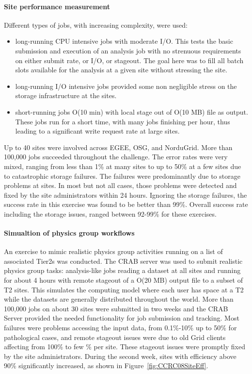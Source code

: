 \paragraph{Site performance measurement}
Different types of jobs, with increasing complexity, were used:
\begin{itemize}
\item long-running CPU intensive jobs with moderate I/O. This tests the basic submission and execution of an analysis job with no strenuous requirements on 
either submit rate, or I/O, or stageout. The goal here was to fill all batch slots available for the analysis at a given site without stressing the site.
\item long-running I/O intensive jobs provided some non negligible stress on 
the storage infrastructure at the sites.
\item short-running jobs O(10 min) with local stage out of O(10 MB) file as output. These jobs run for a short time, with many jobs finishing per hour, thus leading to a significant write request rate at large sites.
\end{itemize}
Up to 40 sites were involved across EGEE, OSG, and NorduGrid. More than 100,000 jobs succeeded throughout the challenge. The error rates were very mixed, ranging from less than 1\% at many sites to up to 50\% at a few sites due to
catastrophic storage failures. The failures were predominantly
due to storage problems at sites. In most but not all cases, those problems were detected and fixed by the site administrators within 24 hours. Ignoring the storage failures, the success rate in this exercise was found to be better than 99\%. Overall success rate including the storage issues, ranged between 92-99\% for these exercises.

\paragraph{Simualtion of physics group workflows}
An exercise to mimic realistic physics group activities running
on a list of associated Tier2s was conducted. 
The CRAB server was used to submit realistic physics group tasks: 
analysis-like jobs reading a dataset at all sites and running for 
about 4 hours with remote stageout of a O(20 MB) output file to a subset of T2
sites. This simulates the computing model where each user has space at a T2 while the datasets are generally distributed throughout the world.
More than 100,000 jobs on about 30 sites were submitted in two weeks and 
the CRAB Server provided the needed functionality for job submission and 
tracking. %
Most failures were problems accessing the input data, from 0.1\%-10\% up to 50\% for pathological cases, and remote stageout issues were due to old Grid clients affecting from 100\% to few \% per site. These stageout issues were
promptly fixed by the site administrators. 
During the second week, sites with efficiency above 90\% significantly increased, as shown in Figure~\ref{fig:CCRC08SiteEff}.
